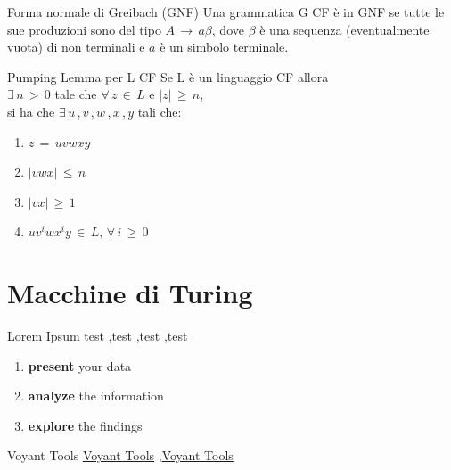 \documentclass[10pt,a4paper]{article}
\begin{document}
\begin{multicols}{3}
\begin{textbox}{Forma normale di Greibach (GNF)}
Una grammatica G CF è in GNF se tutte le sue produzioni sono del tipo \(A\,\rightarrow\,a\beta\), dove \(\beta\) è una sequenza (eventualmente vuota) di non terminali e \(a\)  è un simbolo terminale.\\
\end{textbox}

\begin{textbox}{Pumping Lemma per L CF}
Se L è un linguaggio CF allora \\
\(\exists \, n \, > \, 0\) tale che \(\forall \, z \, \in \, L \) e
\(|z| \, \geq \, n\),\\si ha che
\(\exists \, u \, ,v \, ,w \, ,x \, ,y\) tali che:
\begin{enumerate}[leftmargin=*]
    \item \(z\, =\, uvwxy\)
    \item \(|vwx|\, \leq\,  n\)
    \item \(|vx|\, \geq\,  1\)
    \item \(uv^iwx^iy\,\in\,L,\,\forall\,i\,\geq\,0\)
\end{enumerate}
\end{textbox}


\section{Macchine di Turing}



\begin{textbox}{Lorem Ipsum}
test  \sep test \sep test \sep test

\bigskip

\begin{enumerate}
\item \textbf{present} your data
\item \textbf{analyze} the information
\item \textbf{explore} the findings
\end{enumerate}

\end{textbox}


\begin{textbox}{Voyant Tools}
 \href{https://voyant-tools.org/}{Voyant Tools} \sep \href{https://voyant-tools.org/}{Voyant Tools}


\end{textbox}
\end{multicols}
\end{document}
